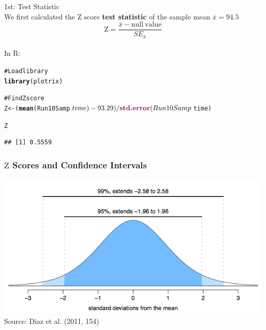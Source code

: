 \documentclass{beamer}\usepackage{graphicx, color}
\makeatletter
\newcommand{\hlfunctioncall}[1]{\textcolor[rgb]{0.501960784313725,0,0.329411764705882}{\textbf{#1}}}%
\newcommand{\hlcomment}[1]{\textcolor[rgb]{0.180392156862745,0.6,0.341176470588235}{#1}}%
\newenvironment{kframe}{%
 \def\at@end@of@kframe{}%
 \ifinner\ifhmode%
  \def\at@end@of@kframe{\end{minipage}}%
  \begin{minipage}{\columnwidth}%
 \fi\fi%
 \def\FrameCommand##1{\hskip\@totalleftmargin \hskip-\fboxsep
 \colorbox{shadecolor}{##1}\hskip-\fboxsep
     \hskip-\linewidth \hskip-\@totalleftmargin \hskip\columnwidth}%
 \MakeFramed {\advance\hsize-\width
   \@totalleftmargin\z@ \linewidth\hsize
   \@setminipage}}%
 {\par\unskip\endMakeFramed%
 \at@end@of@kframe}
\newenvironment{knitrout}{}{} %
\makeatother
\begin{document}
\begin{frame}
{\LARGE{1st: Test Statistic}} \\[0.5cm]
  We first calculated the $\mathrm{Z}$ score {\bf{test statistic}} of the sample mean $\bar{x} = 94.5$
\[
  \mathrm{Z} = \frac{\bar{x} - \mathrm{null\:value}}{SE_{\bar{x}}}
\]\\[0.25cm]
In R:
\begin{knitrout}
\color{fgcolor}\begin{kframe}
\begin{alltt}
\hlcomment{# Load library}
\hlfunctioncall{library}(plotrix)

\hlcomment{# Find Z score }
Z <- (\hlfunctioncall{mean}(Run10Samp$time) - 93.29)/
      \hlfunctioncall{std.error}(Run10Samp$time)

Z
\end{alltt}
\begin{verbatim}
## [1] 0.5559
\end{verbatim}
\end{kframe}
\end{knitrout}

\end{frame}

\begin{frame}
  \frametitle{$\mathrm{Z}$ Scores and Confidence Intervals}
  \begin{center}
    \includegraphics[scale=0.45]{figure/ZScore.png} \\
    Source: Diaz et al. (2011, 154)
  \end{center}
\end{frame}
\end{document}

